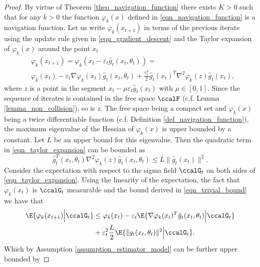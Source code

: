 \documentclass[article]{IEEEtran}
\theoremstyle{definition}
\begin{document}
\begin{proof}
By virtue of Theorem \ref{theo_navigation_function} there exists $K>0$ such that for any $k>0$ the function $\varphi_k(x)$ defined in \eqref{eqn_navigation_function} is a navigation function. Let us write $\varphi_k(x_{t+1})$ in terms of the previous iterate using the update rule given in \eqref{eqn_gradient_descent} and the Taylor expansion of $\varphi_k(x)$ around the point $x_t$
%
\begin{equation}\label{eqn_taylor_expansion}
\begin{split}
&\varphi_k(x_{t+1})= \varphi_k\left(x_t - \varepsilon_t \hat{g}_t(x_t,\theta_t)\right) =\\
& \varphi_k(x_t) - \varepsilon_t\nabla \varphi_k(x_t) \hat{g}_t(x_t,\theta_t) 
+\frac{\varepsilon_t^2}{2} \hat{g}_t(x_t)^T \nabla^2 \varphi_k (z)\hat{g}_t(x_t),
\end{split}
\end{equation}
%
where $z$ is a point in the segment $ x_t - \mu\varepsilon_t\hat{g}_t(x_t)$ with $\mu\in [0,1]$. Since the sequence of iterates is contained in the free space $\ccalF$ (c.f. Lemma \ref{lemma_non_collision}), so is $z$. The free space being  a compact set and $\varphi_k(x)$ being a twice differentiable function (c.f. Definition \ref{def_navigation_function}), the maximum eigenvalue of the Hessian of $\varphi_k(x)$ is upper bounded by a constant. Let $L$ be an upper bound for this eigenvalue. Then the quadratic term in \eqref{eqn_taylor_expansion} can be bounded as
\begin{equation}\label{eqn_trivial_bound}
 \hat{g}_t^T (x_t,\theta_t)\nabla^2 \varphi_k (z)\hat{g}_t(x_t,\theta_t) \leq  L \|\hat{g}_t(x_t)\|^2.
 \end{equation} 
%
Consider the expectation with respect to the sigma field $\ccalG_t$ on both sides of \eqref{eqn_taylor_expansion}. Using the linearity of the expectation, the fact that $\varphi_k(x_t)$ is $\ccalG_t$ measurable and the bound derived in \eqref{eqn_trivial_bound} we have that
%
\begin{equation}
\begin{split}
\E{\varphi_k(x_{t+1})\Big| \ccalG_t} &\leq \varphi_k(x_t) - \varepsilon_t \E{\nabla \varphi_k(x_t)^T \hat{g}_t(x_t,\theta_t)\Big| \ccalG_t} \\
&+\varepsilon_t^2\frac{L}{2}\E{ \|{g}_t(x_t,\theta_t) \|^2\Big| \ccalG_t}.
\end{split}
\end{equation}
%
Which by Assumption \ref{assumption_estimator_model} can be further upper bounded by

\end{proof}
\end{document}
